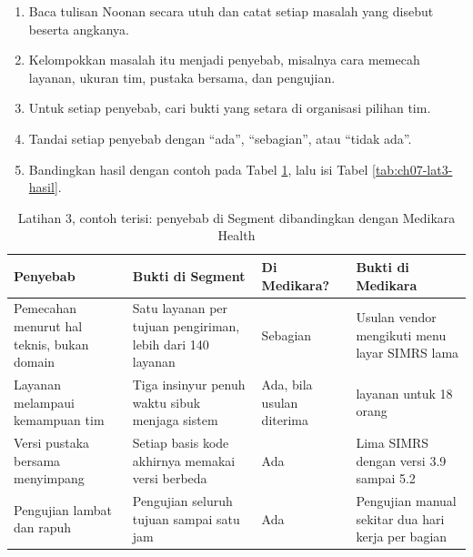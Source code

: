 \begin{enumerate}
  \item Baca tulisan Noonan secara utuh dan catat setiap masalah yang disebut beserta angkanya.
  \item Kelompokkan masalah itu menjadi penyebab, misalnya cara memecah layanan, ukuran tim,
        pustaka bersama, dan pengujian.
  \item Untuk setiap penyebab, cari bukti yang setara di organisasi pilihan tim.
  \item Tandai setiap penyebab dengan ``ada'', ``sebagian'', atau ``tidak ada''.
  \item Bandingkan hasil dengan contoh pada Tabel \ref{tab:ch07-lat3-contoh}, lalu isi Tabel
        \ref{tab:ch07-lat3-hasil}.
\end{enumerate}

\begin{table}[!htb]
  \centering
  \caption{Latihan 3, contoh terisi: penyebab di Segment dibandingkan dengan Medikara Health}
  \label{tab:ch07-lat3-contoh}
  \footnotesize
  \begin{tabularx}{\textwidth}{>{\raggedright\arraybackslash}p{2.6cm} >{\raggedright\arraybackslash}X >{\raggedright\arraybackslash}p{1.5cm} >{\raggedright\arraybackslash}X}
    \hline
    \textbf{Penyebab} & \textbf{Bukti di Segment} & \textbf{Di Medikara?} & \textbf{Bukti di
      Medikara} \\ \hline
    Pemecahan menurut hal teknis, bukan domain & Satu layanan per tujuan pengiriman, lebih dari
      140 layanan & Sebagian & Usulan vendor mengikuti menu layar SIMRS lama \\ \hline
    Layanan melampaui kemampuan tim & Tiga insinyur penuh waktu sibuk menjaga sistem & Ada, bila
      usulan diterima & 32 layanan untuk 18 orang \\ \hline
    Versi pustaka bersama menyimpang & Setiap basis kode akhirnya memakai versi berbeda & Ada &
      Lima SIMRS dengan versi 3.9 sampai 5.2 \\ \hline
    Pengujian lambat dan rapuh & Pengujian seluruh tujuan sampai satu jam & Ada & Pengujian manual
      sekitar dua hari kerja per bagian \\ \hline
  \end{tabularx}
\end{table}

